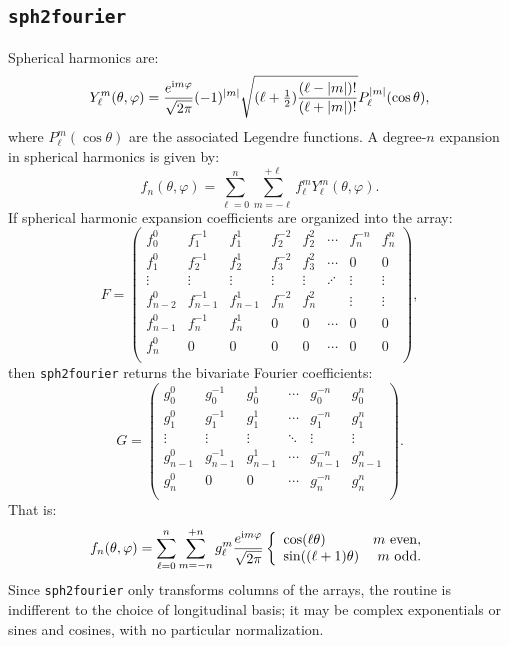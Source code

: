 \documentclass{article}
\def\ii{{\rm i}}
\def\abs#1{\left|{#1}\right|}
\begin{document}
\subsection{{\tt sph2fourier}}

Spherical harmonics are:
\begin{equation}
Y_\ell^m(\theta,\varphi) = \frac{e^{\ii m\varphi}}{\sqrt{2\pi}} (-1)^{\abs{m}}\sqrt{(\ell+\tfrac{1}{2})\frac{(\ell-\abs{m})!}{(\ell+\abs{m})!}} P_\ell^{\abs{m}}(\cos\theta),
\end{equation}
where $P_\ell^m(\cos\theta)$ are the associated Legendre functions. A degree-$n$ expansion in spherical harmonics is given by:
\begin{equation}
f_n(\theta,\varphi) = \sum_{\ell=0}^{n}\sum_{m=-\ell}^{+\ell} f_\ell^m Y_\ell^m(\theta,\varphi).
\end{equation}
If spherical harmonic expansion coefficients are organized into the array:
\begin{equation}
F = \begin{pmatrix}
f_0^0 & f_1^{-1} & f_1^1 & f_2^{-2} & f_2^2 & \cdots & f_n^{-n} & f_n^n\\
f_1^0 & f_2^{-1} & f_2^1 & f_3^{-2} & f_3^2 & \cdots & 0 & 0\\
\vdots & \vdots & \vdots &  \vdots &  \vdots & \iddots & \vdots & \vdots\\
f_{n-2}^0 & f_{n-1}^{-1} & f_{n-1}^1 & f_n^{-2} & f_n^2 &  & \vdots & \vdots\\
f_{n-1}^0 & f_n^{-1} & f_n^1 & 0 & 0 & \cdots & 0 & 0\\
f_n^0 & 0 & 0 & 0 & 0 & \cdots & 0 & 0\\
\end{pmatrix},
\end{equation}
then {\tt sph2fourier} returns the bivariate Fourier coefficients:
\begin{equation}
G = \begin{pmatrix}
g_0^0 & g_0^{-1} & g_0^1 & \cdots & g_0^{-n} & g_0^n\\
g_1^0 & g_1^{-1} & g_1^1 & \cdots & g_1^{-n} & g_1^n\\
\vdots & \vdots & \vdots & \ddots & \vdots & \vdots\\
g_{n-1}^0 & g_{n-1}^{-1} & g_{n-1}^1& \cdots & g_{n-1}^{-n} & g_{n-1}^n\\
g_n^0 & 0 & 0 & \cdots & g_n^{-n} & g_n^n\\
\end{pmatrix}.
\end{equation}
That is:
\begin{equation}
f_n(\theta,\varphi) = \sum_{\ell=0}^n\sum_{m=-n}^{+n} g_\ell^m \frac{e^{\ii m\varphi}}{\sqrt{2\pi}} \left\{\begin{array}{lr} \cos(\ell\theta) & m~{\rm even},\\ \sin((\ell+1)\theta) & m~{\rm odd}.\end{array}\right.
\end{equation}
Since {\tt sph2fourier} only transforms columns of the arrays, the routine is indifferent to the choice of longitudinal basis; it may be complex exponentials or sines and cosines, with no particular normalization.
\end{document}
